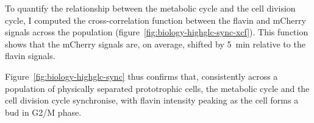 To quantify the relationship between the metabolic cycle and the cell division cycle, I computed the cross-correlation function between the flavin and mCherry signals across the population (figure~\ref{fig:biology-highglc-sync-xcf}).
This function shows that the mCherry signals are, on average, shifted by \SI{5}{\minute} relative to the flavin signals.

Figure~\ref{fig:biology-highglc-sync} thus confirms that, consistently across a population of physically separated prototrophic cells, the metabolic cycle and the cell division cycle synchronise, with flavin intensity peaking as the cell forms a bud in G2/M phase.


